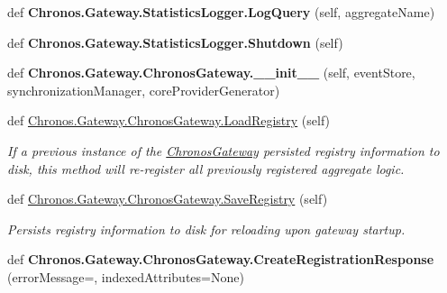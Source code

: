 \begin{DoxyCompactItemize}
\item 
def {\bfseries Chronos.\+Gateway.\+Statistics\+Logger.\+Log\+Query} (self, aggregate\+Name)\hypertarget{group__Chronos_ga77994e8755d5129321f020aa21b45143}{}\label{group__Chronos_ga77994e8755d5129321f020aa21b45143}

\item 
def {\bfseries Chronos.\+Gateway.\+Statistics\+Logger.\+Shutdown} (self)\hypertarget{group__Chronos_ga80e737d0b23b0409a07a8debaa266d83}{}\label{group__Chronos_ga80e737d0b23b0409a07a8debaa266d83}

\item 
def {\bfseries Chronos.\+Gateway.\+Chronos\+Gateway.\+\_\+\+\_\+init\+\_\+\+\_\+} (self, event\+Store, synchronization\+Manager, core\+Provider\+Generator)\hypertarget{group__Chronos_gaa12c0fa0c8f9a2738ebbd1e203f154ec}{}\label{group__Chronos_gaa12c0fa0c8f9a2738ebbd1e203f154ec}

\item 
def \hyperlink{group__Chronos_ga6d1d412b8ee16cf3bf7be976a4041ced}{Chronos.\+Gateway.\+Chronos\+Gateway.\+Load\+Registry} (self)
\begin{DoxyCompactList}\small\item\em If a previous instance of the \hyperlink{classChronos_1_1Gateway_1_1ChronosGateway}{Chronos\+Gateway} persisted registry information to disk, this method will re-\/register all previously registered aggregate logic. \end{DoxyCompactList}\item 
def \hyperlink{group__Chronos_ga20a6380c276ad93d3f59832c88b1b863}{Chronos.\+Gateway.\+Chronos\+Gateway.\+Save\+Registry} (self)
\begin{DoxyCompactList}\small\item\em Persists registry information to disk for reloading upon gateway startup. \end{DoxyCompactList}\item 
def {\bfseries Chronos.\+Gateway.\+Chronos\+Gateway.\+Create\+Registration\+Response} (error\+Message=\textquotesingle{}\textquotesingle{}, indexed\+Attributes=None)\hypertarget{group__Chronos_ga54f2405b5538b79469b2a925b9482f5c}{}\label{group__Chronos_ga54f2405b5538b79469b2a925b9482f5c}


\end{DoxyCompactItemize}
